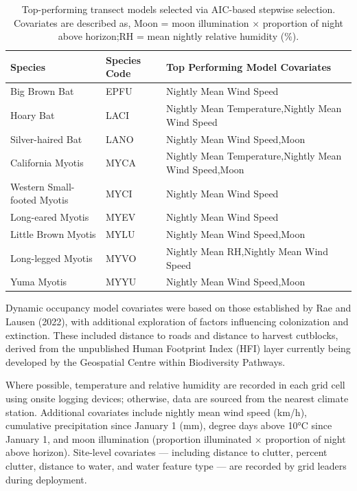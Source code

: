 \documentclass[
  letterpaper,
  DIV=11,
  numbers=noendperiod]{scrartcl}
\begin{document}
\begin{longtable}[l]{>{\raggedright\arraybackslash}p{15em}>{\raggedright\arraybackslash}p{8em}>{\raggedright\arraybackslash}p{20em}}

\caption{\label{tbl-cov-transects}Top-performing transect models
selected via AIC-based stepwise selection. Covariates are described as,
Moon = moon illumination × proportion of night above horizon;RH = mean
nightly relative humidity (\%).}

\tabularnewline

\toprule
Species & Species Code & Top Performing Model Covariates\\
\midrule
Big Brown Bat & EPFU & Nightly Mean Wind Speed\\
Hoary Bat & LACI & Nightly Mean Temperature,Nightly Mean Wind Speed\\
Silver-haired Bat & LANO & Nightly Mean Wind Speed,Moon\\
California Myotis & MYCA & Nightly Mean Temperature,Nightly Mean Wind Speed,Moon\\
Western Small-footed Myotis & MYCI & Nightly Mean Wind Speed\\
\addlinespace
Long-eared Myotis & MYEV & Nightly Mean Wind Speed\\
Little Brown Myotis & MYLU & Nightly Mean Wind Speed,Moon\\
Long-legged Myotis & MYVO & Nightly Mean RH,Nightly Mean Wind Speed\\
Yuma Myotis & MYYU & Nightly Mean Wind Speed,Moon\\
\bottomrule

\end{longtable}

Dynamic occupancy model covariates were based on those established by
Rae and Lausen (2022), with additional exploration of factors
influencing colonization and extinction. These included distance to
roads and distance to harvest cutblocks, derived from the unpublished
Human Footprint Index (HFI) layer currently being developed by the
Geospatial Centre within Biodiversity Pathways.

Where possible, temperature and relative humidity are recorded in each
grid cell using onsite logging devices; otherwise, data are sourced from
the nearest climate station. Additional covariates include nightly mean
wind speed (km/h), cumulative precipitation since January 1 (mm), degree
days above 10°C since January 1, and moon illumination (proportion
illuminated × proportion of night above horizon). Site-level covariates
--- including distance to clutter, percent clutter, distance to water,
and water feature type --- are recorded by grid leaders during
deployment.
\end{document}
